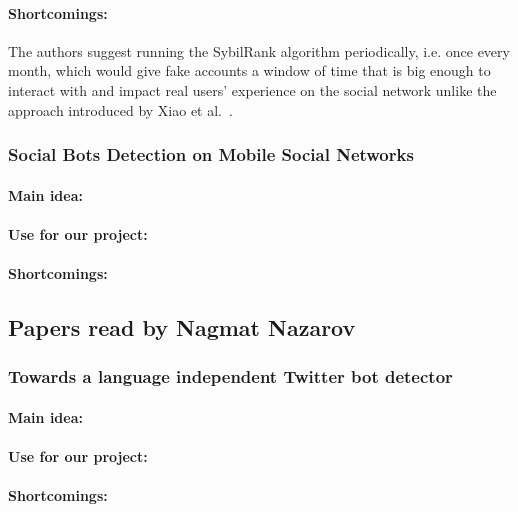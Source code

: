 \paragraph{Shortcomings:}
The authors suggest running the SybilRank algorithm periodically, i.e. once every month, which would give fake accounts a window of time that is big enough to interact with and impact real users' experience on the social network unlike the approach introduced by Xiao et al.~\cite{xiao2015detecting}.

\subsubsection{Social Bots Detection on Mobile Social Networks}

\paragraph{Main idea:}
\cite{binlin2017social}

\paragraph{Use for our project:}

\paragraph{Shortcomings:}

\subsection{Papers read by Nagmat Nazarov}
\subsubsection{Towards a language independent Twitter bot detector}

\paragraph{Main idea:}

\cite{lundberg2019towards}

\paragraph{Use for our project:}

\paragraph{Shortcomings:}

